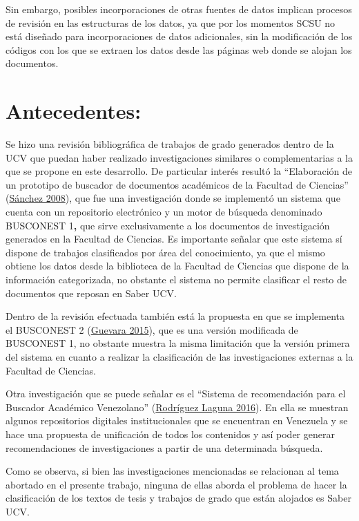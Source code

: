 \documentclass[
  12pt,
  openany]{book}
\begin{document}
Sin embargo, posibles incorporaciones de otras fuentes de datos implican procesos de revisión en las estructuras de los datos, ya que por los momentos SCSU no está diseñado para incorporaciones de datos adicionales, sin la modificación de los códigos con los que se extraen los datos desde las páginas web donde se alojan los documentos.

\hypertarget{antecedentes}{%
\section{Antecedentes:}\label{antecedentes}}

Se hizo una revisión bibliográfica de trabajos de grado generados dentro de la UCV que puedan haber realizado investigaciones similares o complementarias a la que se propone en este desarrollo. De particular interés resultó la ``Elaboración de un prototipo de buscador de documentos académicos de la Facultad de Ciencias'' (\protect\hyperlink{ref-sanchez2008}{Sánchez 2008}), que fue una investigación donde se implementó un sistema que cuenta con un repositorio electrónico y un motor de búsqueda denominado BUSCONEST 1\textbf{,} que sirve exclusivamente a los documentos de investigación generados en la Facultad de Ciencias. Es importante señalar que este sistema sí dispone de trabajos clasificados por área del conocimiento, ya que el mismo obtiene los datos desde la biblioteca de la Facultad de Ciencias que dispone de la información categorizada, no obstante el sistema no permite clasificar el resto de documentos que reposan en Saber UCV.

Dentro de la revisión efectuada también está la propuesta en que se implementa el BUSCONEST 2 (\protect\hyperlink{ref-guevara2015}{Guevara 2015}), que es una versión modificada de BUSCONEST 1, no obstante muestra la misma limitación que la versión primera del sistema en cuanto a realizar la clasificación de las investigaciones externas a la Facultad de Ciencias.

Otra investigación que se puede señalar es el ``Sistema de recomendación para el Buscador Académico Venezolano'' (\protect\hyperlink{ref-rodriguezlaguna2016}{Rodríguez Laguna 2016}). En ella se muestran algunos repositorios digitales institucionales que se encuentran en Venezuela y se hace una propuesta de unificación de todos los contenidos y así poder generar recomendaciones de investigaciones a partir de una determinada búsqueda.

Como se observa, si bien las investigaciones mencionadas se relacionan al tema abortado en el presente trabajo, ninguna de ellas aborda el problema de hacer la clasificación de los textos de tesis y trabajos de grado que están alojados es Saber UCV.
\end{document}
